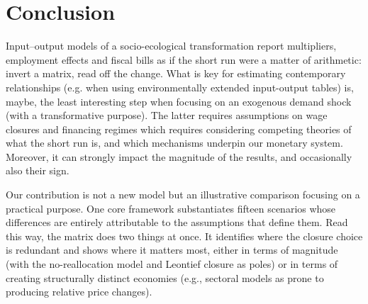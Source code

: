 \section{Conclusion}\label{sec:conclusion}

Input--output models of a socio-ecological transformation report multipliers, employment
effects and fiscal bills as if the short run were a matter of arithmetic:
invert a matrix, read off the change. What is key for estimating contemporary relationships (e.g. when using environmentally extended input-output tables) is, maybe, the least interesting step when focusing on an exogenous demand shock (with a transformative purpose). The latter requires assumptions on wage closures and financing regimes which requires considering competing theories of what the short run is, and which mechanisms underpin our monetary system. Moreover, it can strongly impact the magnitude of the results, and occasionally also their sign.

Our contribution is not a new model but an illustrative comparison focusing on a practical purpose. One core framework substantiates fifteen scenarios whose differences are entirely attributable to the assumptions that define them. Read this way,
the matrix does two things at once. It identifies where the closure choice
is redundant and shows where it matters most, either in terms of magnitude (with the no-reallocation model and Leontief closure as poles) or in terms of creating structurally distinct economies (e.g., sectoral models as prone to producing relative price changes).


